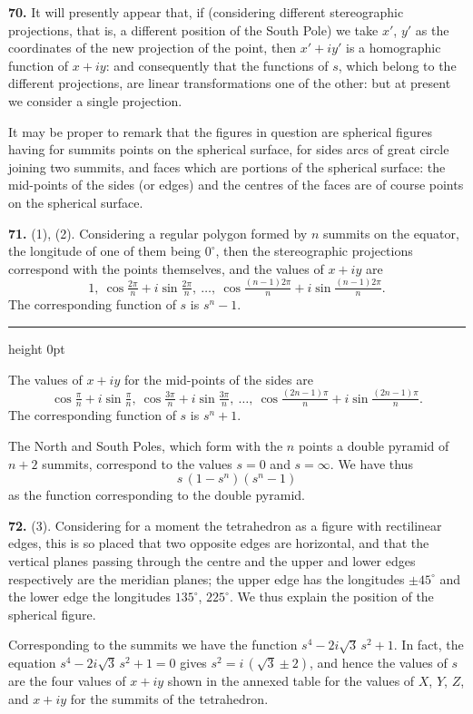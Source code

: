 \documentclass[11pt,a4paper]{article}
\newcommand{\artno}[1]{\textbf{#1.}\quad}
\begin{document}
\artno{70} It will presently appear that, if (considering different
stereographic projections, that is, a different position of the South Pole)
we take $x'$, $y'$ as the coordinates of the new projection of the point,
then $x' + iy'$ is a homographic function of $x + iy$: and consequently that
the functions of $s$, which belong to the different projections, are linear
transformations one of the other: but at present we consider a single
projection.

It may be proper to remark that the figures in question are spherical
figures having for summits points on the spherical surface, for sides arcs
of great circle joining two summits, and faces which are portions of the
spherical surface: the mid-points of the sides (or edges) and the centres of
the faces are of course points on the spherical surface.

\artno{71} (1), (2). Considering a regular polygon formed by $n$ summits on
the equator, the longitude of one of them being $0^{\circ}$, then the
stereographic projections correspond with the points themselves, and the
values of $x + iy$ are
\[
  1,\ \cos\tfrac{2\pi}{n} + i\sin\tfrac{2\pi}{n},\ \dotsc,\
  \cos\tfrac{(n-1)2\pi}{n} + i\sin\tfrac{(n-1)2\pi}{n}.
\]
The corresponding function of $s$ is $s^{n} - 1$.

\bigskip
\hrule height 0pt
\bigskip

\noindent
The values of $x + iy$ for the mid-points of the sides are
\[
  \cos\tfrac{\pi}{n} + i\sin\tfrac{\pi}{n},\ \cos\tfrac{3\pi}{n}
   + i\sin\tfrac{3\pi}{n},\ \dotsc,\ \cos\tfrac{(2n-1)\pi}{n}
   + i\sin\tfrac{(2n-1)\pi}{n}.
\]
The corresponding function of $s$ is $s^{n} + 1$.

The North and South Poles, which form with the $n$ points a double pyramid
of $n + 2$ summits, correspond to the values $s = 0$ and $s = \infty$. We
have thus
\[
  s\,(1 - s^{n})(s^{n} - 1)
\]
as the function corresponding to the double pyramid.

\artno{72} (3). Considering for a moment the tetrahedron as a figure with
rectilinear edges, this is so placed that two opposite edges are horizontal,
and that the vertical planes passing through the centre and the upper and
lower edges respectively are the meridian planes; the upper edge has the
longitudes $\pm 45^{\circ}$ and the lower edge the longitudes $135^{\circ}$,
$225^{\circ}$. We thus explain the position of the spherical figure.

Corresponding to the summits we have the function $s^{4} - 2i\sqrt{3}\,s^{2} + 1$.
In fact, the equation $s^{4} - 2i\sqrt{3}\,s^{2} + 1 = 0$ gives
$s^{2} = i\,(\sqrt{3} \pm 2)$, and hence the values of $s$ are the four values
of $x + iy$ shown in the annexed table for the values of $X$, $Y$, $Z$, and
$x + iy$ for the summits of the tetrahedron.
\end{document}
